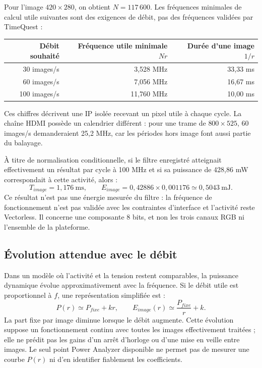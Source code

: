 \documentclass[11pt,a4paper]{article}
\begin{document}
Pour l'image $420\times280$, on obtient $N=117\,600$. Les fréquences minimales de calcul utile suivantes sont des exigences de débit, pas des fréquences validées par TimeQuest :
\begin{center}
\begin{tabular}{@{}rrr@{}}
\toprule
Débit souhaité & Fréquence utile minimale $Nr$ & Durée d'une image $1/r$\\
\midrule
30 images/s & 3,528 MHz & 33,33 ms\\
60 images/s & 7,056 MHz & 16,67 ms\\
100 images/s & 11,760 MHz & 10,00 ms\\
\bottomrule
\end{tabular}
\end{center}
Ces chiffres décrivent une IP isolée recevant un pixel utile à chaque cycle. La chaîne HDMI possède un calendrier différent : pour une trame de $800\times525$, 60 images/s demanderaient 25,2 MHz, car les périodes hors image font aussi partie du balayage.

À titre de normalisation conditionnelle, si le filtre enregistré atteignait effectivement un résultat par cycle à 100 MHz et si sa puissance de 428,86 mW correspondait à cette activité, alors :
\[
 T_{image}=1{,}176\ \mathrm{ms},\qquad
 E_{image}=0{,}42886\times0{,}001176
 \simeq0{,}5043\ \mathrm{mJ}.
\]
Ce résultat n'est pas une énergie mesurée du filtre : la fréquence de fonctionnement n'est pas validée avec les contraintes d'interface et l'activité reste Vectorless. Il concerne une composante 8 bits, et non les trois canaux RGB ni l'ensemble de la plateforme.

\subsection{Évolution attendue avec le débit}
Dans un modèle où l'activité et la tension restent comparables, la puissance dynamique évolue approximativement avec la fréquence. Si le débit utile est proportionnel à $f$, une représentation simplifiée est :
\[
 P(r)\simeq P_{fixe}+k r,\qquad
 E_{image}(r)\simeq\frac{P_{fixe}}{r}+k.
\]
La part fixe par image diminue lorsque le débit augmente. Cette évolution suppose un fonctionnement continu avec toutes les images effectivement traitées ; elle ne prédit pas les gains d'un arrêt d'horloge ou d'une mise en veille entre images. Le seul point Power Analyzer disponible ne permet pas de mesurer une courbe $P(r)$ ni d'en identifier fiablement les coefficients.
\end{document}
